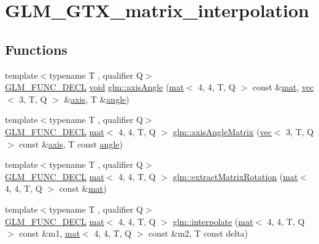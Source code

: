 \hypertarget{group__gtx__matrix__interpolation}{}\section{G\+L\+M\+\_\+\+G\+T\+X\+\_\+matrix\+\_\+interpolation}
\label{group__gtx__matrix__interpolation}
\subsection*{Functions}
\begin{DoxyCompactItemize}
\item 
{\footnotesize template$<$typename T , qualifier Q$>$ }\\\hyperlink{setup_8hpp_ab2d052de21a70539923e9bcbf6e83a51}{G\+L\+M\+\_\+\+F\+U\+N\+C\+\_\+\+D\+E\+CL} \hyperlink{_s_d_l__opengles2__gl2ext_8h_ae5d8fa23ad07c48bb609509eae494c95}{void} \hyperlink{group__gtx__matrix__interpolation_ga97f160158906ea89676f56cc4697ec98}{glm\+::axis\+Angle} (\hyperlink{structglm_1_1mat}{mat}$<$ 4, 4, T, Q $>$ const \&\hyperlink{structglm_1_1mat}{mat}, \hyperlink{structglm_1_1vec}{vec}$<$ 3, T, Q $>$ \&\hyperlink{group__gtc__quaternion_gaaf2707d3081789ce097daaa6e54d5287}{axis}, T \&\hyperlink{_s_d_l__opengl__glext_8h_a9e06c1f76a20fed54ca742cd25cb02c4}{angle})
\item 
{\footnotesize template$<$typename T , qualifier Q$>$ }\\\hyperlink{setup_8hpp_ab2d052de21a70539923e9bcbf6e83a51}{G\+L\+M\+\_\+\+F\+U\+N\+C\+\_\+\+D\+E\+CL} \hyperlink{structglm_1_1mat}{mat}$<$ 4, 4, T, Q $>$ \hyperlink{group__gtx__matrix__interpolation_ga992a5db71893ed1ba6ebac99f0f69831}{glm\+::axis\+Angle\+Matrix} (\hyperlink{structglm_1_1vec}{vec}$<$ 3, T, Q $>$ const \&\hyperlink{group__gtc__quaternion_gaaf2707d3081789ce097daaa6e54d5287}{axis}, T const \hyperlink{_s_d_l__opengl__glext_8h_a9e06c1f76a20fed54ca742cd25cb02c4}{angle})
\item 
{\footnotesize template$<$typename T , qualifier Q$>$ }\\\hyperlink{setup_8hpp_ab2d052de21a70539923e9bcbf6e83a51}{G\+L\+M\+\_\+\+F\+U\+N\+C\+\_\+\+D\+E\+CL} \hyperlink{structglm_1_1mat}{mat}$<$ 4, 4, T, Q $>$ \hyperlink{group__gtx__matrix__interpolation_ga8834d4499a1a52fcf531b4506f0b5f67}{glm\+::extract\+Matrix\+Rotation} (\hyperlink{structglm_1_1mat}{mat}$<$ 4, 4, T, Q $>$ const \&\hyperlink{structglm_1_1mat}{mat})
\item 
{\footnotesize template$<$typename T , qualifier Q$>$ }\\\hyperlink{setup_8hpp_ab2d052de21a70539923e9bcbf6e83a51}{G\+L\+M\+\_\+\+F\+U\+N\+C\+\_\+\+D\+E\+CL} \hyperlink{structglm_1_1mat}{mat}$<$ 4, 4, T, Q $>$ \hyperlink{group__gtx__matrix__interpolation_gad5fc63a2e084000b39f6508ab07421a5}{glm\+::interpolate} (\hyperlink{structglm_1_1mat}{mat}$<$ 4, 4, T, Q $>$ const \&m1, \hyperlink{structglm_1_1mat}{mat}$<$ 4, 4, T, Q $>$ const \&m2, T const delta)
\end{DoxyCompactItemize}



